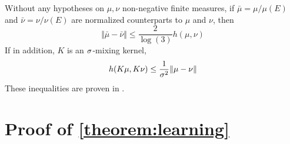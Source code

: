 \begin{proposition}\label{prop:comparaison}
Without any hypotheses on $\mu, \nu$ non-negative finite measures, if $\bar \mu = \mu / \mu(E)$ and $\bar \nu = \nu / \nu(E)$ are normalized counterparts to $\mu$ and $\nu$, then
    \begin{equation}\label{eq:tv-to-hilbert}
        \Vert \bar\mu - \bar\nu \Vert \leq \frac{2}{\log(3)}h(\mu, \nu)
    \end{equation}
If in addition, $K$ is an $\sigma$-mixing kernel,
\begin{equation}\label{eq:hilbert-to-tv}
    h(K\mu, K\nu) \leq \frac{1}{\sigma^2} \Vert \mu - \nu \Vert
\end{equation}
These inequalities are proven in \cite{cohen}.
\end{proposition}
\section{Proof of \cref{theorem:learning}}\label{sec:proof-learning}








